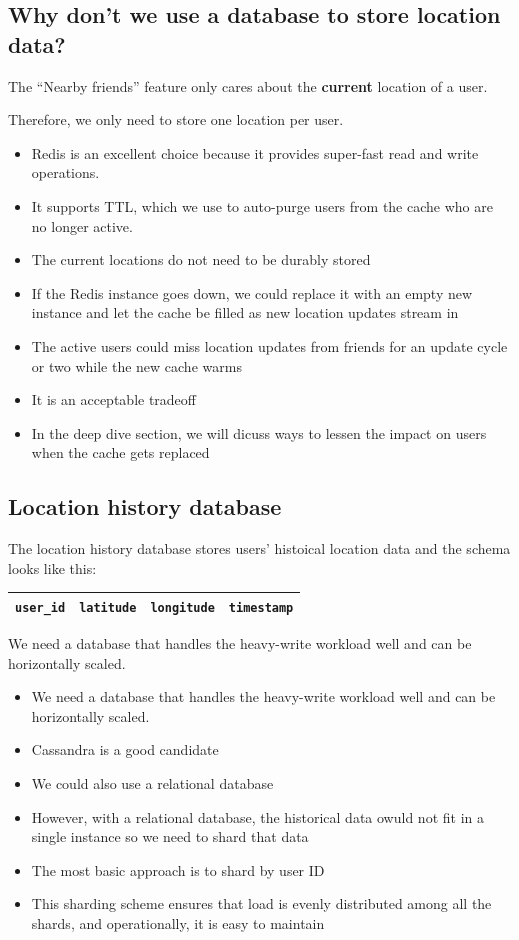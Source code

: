 \documentclass{report}
\theoremstyle{definition}
\let\oldsubsection\subsection
\renewcommand{\subsection}{\oldsubsection*}
\begin{document}
\subsection{Why don't we use a database to store location data?}

The ``Nearby friends'' feature only cares about the \textbf{current} location of a user.

Therefore, we only need to store one location per user.

\begin{itemize}
\item
Redis is an excellent choice because it provides super-fast read and write operations.
\item
It supports TTL, which we use to auto-purge users from the cache who are no longer active.
\item
The current locations do not need to be durably stored
\item
If the Redis instance goes down, we could replace it with an empty new instance and let the cache be filled as new location updates stream in
\item
The active users could miss location updates from friends for an update cycle or two while the new cache warms
\item
It is an acceptable tradeoff
\item
In the deep dive section, we will dicuss ways to lessen the impact on users when the cache gets replaced
\end{itemize}

\subsection{Location history database}

The location history database stores users' histoical location data and the schema looks like this:

\begin{tabular}{|p{3.5cm}|p{3.5cm}|p{3.5cm}|p{3.5cm}|}
\hline
\lstinline|user_id| & \lstinline|latitude| & \lstinline|longitude| & \lstinline|timestamp| \\
\hline
\end{tabular}

We need a database that handles the heavy-write workload well and can be horizontally scaled.

\begin{itemize}
\item
We need a database that handles the heavy-write workload well and can be horizontally scaled.
\item
Cassandra is a good candidate
\item
We could also use a relational database
\item
However, with a relational database, the historical  data owuld not fit in a single instance so we need to shard that data
\item
The most basic approach is to shard by user ID
\item
This sharding scheme ensures that load is evenly distributed among all the shards, and operationally, it is easy to maintain
\end{itemize}
\end{document}
